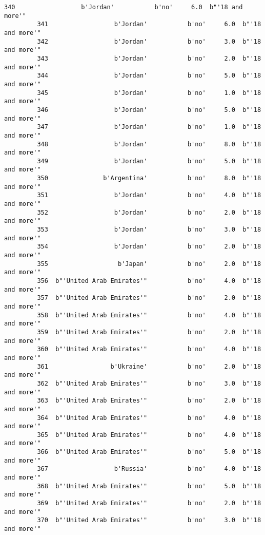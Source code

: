 \documentclass[11pt]{article}
\begin{document}
\begin{Verbatim}[commandchars=\\\{\}]
         340                  b'Jordan'           b'no'     6.0  b"'18 and more'"   
         341                  b'Jordan'           b'no'     6.0  b"'18 and more'"   
         342                  b'Jordan'           b'no'     3.0  b"'18 and more'"   
         343                  b'Jordan'           b'no'     2.0  b"'18 and more'"   
         344                  b'Jordan'           b'no'     5.0  b"'18 and more'"   
         345                  b'Jordan'           b'no'     1.0  b"'18 and more'"   
         346                  b'Jordan'           b'no'     5.0  b"'18 and more'"   
         347                  b'Jordan'           b'no'     1.0  b"'18 and more'"   
         348                  b'Jordan'           b'no'     8.0  b"'18 and more'"   
         349                  b'Jordan'           b'no'     5.0  b"'18 and more'"   
         350               b'Argentina'           b'no'     8.0  b"'18 and more'"   
         351                  b'Jordan'           b'no'     4.0  b"'18 and more'"   
         352                  b'Jordan'           b'no'     2.0  b"'18 and more'"   
         353                  b'Jordan'           b'no'     3.0  b"'18 and more'"   
         354                  b'Jordan'           b'no'     2.0  b"'18 and more'"   
         355                   b'Japan'           b'no'     2.0  b"'18 and more'"   
         356  b"'United Arab Emirates'"           b'no'     4.0  b"'18 and more'"   
         357  b"'United Arab Emirates'"           b'no'     2.0  b"'18 and more'"   
         358  b"'United Arab Emirates'"           b'no'     4.0  b"'18 and more'"   
         359  b"'United Arab Emirates'"           b'no'     2.0  b"'18 and more'"   
         360  b"'United Arab Emirates'"           b'no'     4.0  b"'18 and more'"   
         361                 b'Ukraine'           b'no'     2.0  b"'18 and more'"   
         362  b"'United Arab Emirates'"           b'no'     3.0  b"'18 and more'"   
         363  b"'United Arab Emirates'"           b'no'     2.0  b"'18 and more'"   
         364  b"'United Arab Emirates'"           b'no'     4.0  b"'18 and more'"   
         365  b"'United Arab Emirates'"           b'no'     4.0  b"'18 and more'"   
         366  b"'United Arab Emirates'"           b'no'     5.0  b"'18 and more'"   
         367                  b'Russia'           b'no'     4.0  b"'18 and more'"   
         368  b"'United Arab Emirates'"           b'no'     5.0  b"'18 and more'"   
         369  b"'United Arab Emirates'"           b'no'     2.0  b"'18 and more'"   
         370  b"'United Arab Emirates'"           b'no'     3.0  b"'18 and more'"   

\end{Verbatim}
\end{document}
